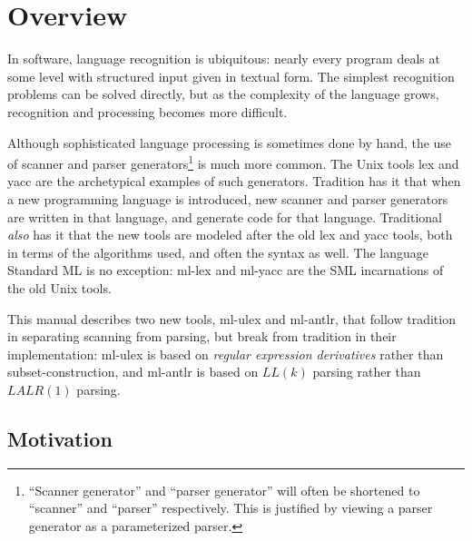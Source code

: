 \chapter{Overview}\label{chap:overview}

In software, language recognition is ubiquitous: nearly every program deals at some level with structured input given in textual form.  The simplest recognition problems can be solved directly, but as the complexity of the language grows, recognition and processing becomes more difficult.  

Although sophisticated language processing is sometimes done by hand, the use of scanner and parser generators\footnote{
  ``Scanner generator'' and ``parser generator'' will often be shortened to ``scanner'' and ``parser'' respectively.  This is justified by viewing a parser generator as a parameterized parser.
} is much more common.  The {\sc Unix} tools {\sc lex} and {\sc yacc} are the archetypical examples of such generators.  Tradition has it that when a new programming language is introduced, new scanner and parser generators are written in that language, and generate code for that language.  Traditional \emph{also} has it that the new tools are modeled after the old {\sc lex} and {\sc yacc} tools, both in terms of the algorithms used, and often the syntax as well.  The language {\sc Standard ML} is no exception: {\sc ml-lex} and {\sc ml-yacc} are the {\sc SML} incarnations of the old {\sc Unix} tools.

This manual describes two new tools, {\sc ml-ulex} and {\sc ml-antlr}, that follow tradition in separating scanning from parsing, but break from tradition in their implementation: {\sc ml-ulex} is based on \emph{regular expression derivatives} rather than subset-construction, and {\sc ml-antlr} is based on $LL(k)$ parsing rather than $LALR(1)$ parsing.   

\section{Motivation}









